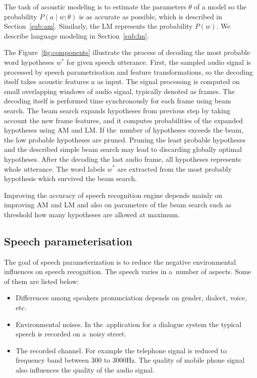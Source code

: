 The task of acoustic modeling is to estimate the parameters $\theta$ of a model so the probability $P(a \mid w ; \theta)$ is as accurate as possible, which is described in Section~\ref{sub:am}. 
Similarly, the \ac{LM} represents the probability $P(w)$.
We describe language modeling in Section~\ref{sub:lm}.

The Figure~\ref{fig:components} illustrate the process of decoding the most probable word hypotheses $w^*$ for given speech utterance. 
First, the sampled audio signal is processed by speech parametrisation and feature transformations, so the decoding itself takes acoustic features $a$ as input. The signal processing is computed on small overlapping windows of audio signal, typically denoted as frames.
The decoding itself is performed time synchronously for each frame using beam search.
The beam search expands hypotheses from previous step by taking account the new frame features, and it computes probabilities of the expanded hypotheses using \ac{AM} and \ac{LM}.
If the~number of hypotheses exceeds the beam, the low probable hypotheses are pruned.
Pruning the least probable hypotheses and the described simple beam search may lead to discarding globally optimal hypotheses.
After the decoding the last audio frame, all hypotheses represents whole utterance.
The word labels $w^*$ are extracted from the most probably hypothesis which survived the beam search.

Improving the accuracy of speech recognition engine depends mainly on improving \ac{AM} and \ac{LM}
and also on parameters of the beam search such as threshold how many hypotheses are allowed at maximum.


\subsection{Speech parameterisation}
\label{sub:param}
The goal of speech parameterization is to reduce the negative environmental influences on speech recognition.
The speech varies in a~number of aspects. Some of them are listed below:
\begin{itemize}
    \item Differences among speakers pronunciation depends on gender, dialect, voice, etc.
    \item Environmental noises. In the~application for a dialogue system the typical speech is
        recorded on a~noisy street. 
    \item The recorded channel. 
        For example the telephone signal is reduced to frequency band between 300 to 3000Hz.
        The quality of mobile phone signal also influences the quality of the audio signal.
\end{itemize}

